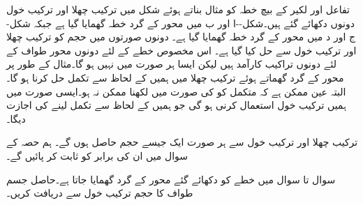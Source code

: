 \begin{figure}
\begin{subfigure}{0.45\textwidth}
\caption{}
\end{subfigure}
\caption{}
\label{شکل_تکمل_استعمال_چھلا_خول}
\end{figure}

تفاعل  اور لکیر  کے بیچ خطہ کو مثال بناتے ہوئے شکل  میں ترکیب چھلا اور ترکیب خول دونوں دکھائے گئے ہیں۔شکل--ا اور ب میں  محور کے گرد خطہ گھمایا گیا ہے جبکہ شکل-ج اور د میں  محور کے گرد خطہ گھمایا گیا ہے۔ دونوں صورتوں میں حجم کو ترکیب چھلا اور ترکیب خول سے حل کیا گیا ہے۔ اس مخصوص خطے کے لئے دونوں محور طواف کے لئے دونوں تراکیب کارآمد ہیں لیکن ایسا ہر صورت میں نہیں ہو گا۔مثال کے طور پر  محور کے گرد گھماتے ہوئے ترکیب چھلا میں ہمیں  کے لحاظ سے تکمل حل کرنا ہو گا۔البتہ عین ممکن ہے کہ متکمل کو  کی صورت میں لکھنا ممکن نہ ہو۔ایسی صورت میں ہمیں ترکیب خول استعمال کرنی ہو گی جو ہمیں  کے لحاظ سے تکمل لینے کی اجازت دیگا۔

ترکیب چھلا اور ترکیب خول سے ہر صورت ایک جیسے حجم حاصل ہوں گے۔ ہم حصہ  کے سوال  میں ان کی برابر کو ثابت کر پائیں گے۔

سوال  تا سوال  میں خطے کو دکھائے گئے محور کے گرد گھمایا جاتا ہے۔حاصل جسم طواف کا حجم ترکیب خول سے دریافت کریں۔

